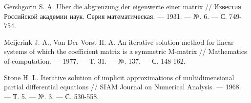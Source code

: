 \documentclass[14pt, a4paper]{extreport}
\begin{document}
\begin{thebibliography}{XXXX}
	Gershgorin S. A. Uber die abgrenzung der eigenwerte einer matrix // Известия Российской академии наук. Серия математическая. --- 1931. --- №. 6. --- С. 749-754.
	
	Meijerink J. A., Van Der Vorst H. A. An iterative solution method for linear systems of which the coefficient matrix is a symmetric M-matrix // Mathematics of computation. --- 1977. --- Т. 31. --- №. 137. --- С. 148-162.
	
	Stone H. L. Iterative solution of implicit approximations of multidimensional partial differential equations // SIAM Journal on Numerical Analysis. --- 1968. --- Т. 5. --- №. 3. --- С. 530-558.
	
	
\end{thebibliography}
\end{document}
